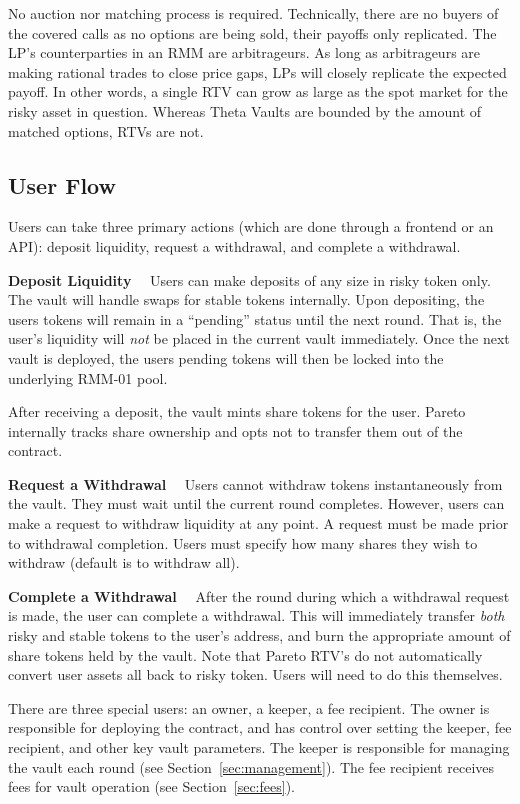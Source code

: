 \documentclass[hidelinks, 12pt]{article}
\begin{document}
No auction nor matching process is required. Technically, there are no buyers of the covered calls as no options are being sold, their payoffs only replicated. The LP's counterparties in an RMM are arbitrageurs. As long as arbitrageurs are making rational trades to close price gaps, LPs will closely replicate the expected payoff. In other words, a single RTV can grow as large as the spot market for the risky asset in question. Whereas Theta Vaults are bounded by the amount of matched options, RTVs are not.

\subsection{User Flow}

Users can take three primary actions (which are done through a frontend or an API): deposit liquidity, request a withdrawal, and complete a withdrawal.

\textbf{Deposit Liquidity}$\quad$ Users can make deposits of any size in risky token only.
The vault will handle swaps for stable tokens internally.
Upon depositing, the users tokens will remain in a ``pending'' status until the next round.
That is, the user's liquidity will \textit{not} be placed in the current vault immediately.
Once the next vault is deployed, the users pending tokens will then be locked into the underlying RMM-01 pool.

After receiving a deposit, the vault mints share tokens for the user. Pareto internally tracks share ownership and opts not to transfer them out of the contract.

\textbf{Request a Withdrawal}$\quad$ Users cannot withdraw tokens instantaneously from the vault. They must wait until the current round completes. However, users can make a request to withdraw liquidity at any point. A request must be made prior to withdrawal completion. Users must specify how many shares they wish to withdraw (default is to withdraw all).

\textbf{Complete a Withdrawal}$\quad$ After the round during which a withdrawal request is made, the user can complete a withdrawal. This will immediately transfer \textit{both} risky and stable tokens to the user's address, and burn the appropriate amount of share tokens held by the vault. Note that Pareto RTV's do not automatically convert user assets all back to risky token. Users will need to do this themselves.

There are three special users: an owner, a keeper, a fee recipient. The owner is responsible for deploying the contract, and has control over setting the keeper, fee recipient, and other key vault parameters. The keeper is responsible for managing the vault each round (see Section~\ref{sec:management}). The fee recipient receives fees for vault operation (see Section~\ref{sec:fees}).
\end{document}
